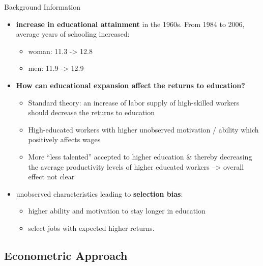\documentclass[10pt,ignorenonframetext,]{beamer}
\providecommand{\tightlist}{%
  \setlength{\itemsep}{0pt}\setlength{\parskip}{0pt}}
\begin{document}
\begin{frame}{Background Information}
\protect\hypertarget{background-information}{}

\begin{itemize}
\item
  \textbf{increase in educational attainment} in the 1960s. From 1984 to
  2006, average years of schooling increased:

  \begin{itemize}
  \tightlist
  \item
    woman: 11.3 -\textgreater{} 12.8
  \item
    men: 11.9 -\textgreater{} 12.9
  \end{itemize}
\item
  \textbf{How can educational expansion affect the returns to
  education?}

  \begin{itemize}
  \tightlist
  \item
    Standard theory: an increase of labor supply of high-skilled workers
    should decrease the returns to education
  \item
    High-educated workers with higher unobserved motivation / ability
    which positively affects wages
  \item
    More ``less talented'' accepted to higher education \& thereby
    decreasing the average productivity levels of higher educated
    workers --\textgreater{} overall effect not clear
  \end{itemize}
\item
  unobserved characteristics leading to \textbf{selection bias}:

  \begin{itemize}
  \tightlist
  \item
    higher ability and motivation to stay longer in education
  \item
    select jobs with expected higher returns.
  \end{itemize}
\end{itemize}

\end{frame}

\hypertarget{econometric-approach}{%
\subsection{Econometric Approach}\label{econometric-approach}}
\end{document}
